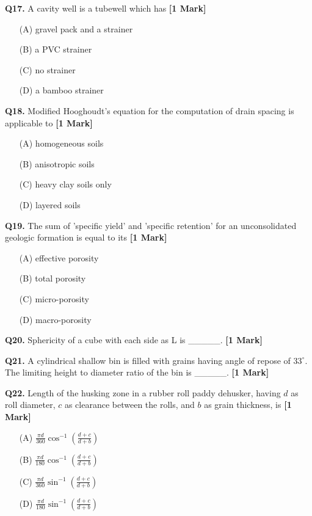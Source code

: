 \documentclass[11pt]{article}
\newcommand{\questiona}[2]{
    \noindent\textbf{Q#2.} #1 \hfill \textbf{[1 Mark]}
}
\begin{document}
\vspace{0.5cm}

\questiona{A cavity well is a tubewell which has}{17}
\begin{enumerate}
    \item[(A)] gravel pack and a strainer
    \item[(B)] a PVC strainer
    \item[(C)] no strainer
    \item[(D)] a bamboo strainer
\end{enumerate}

\vspace{0.5cm}

\questiona{Modified Hooghoudt's equation for the computation of drain spacing is applicable to}{18}
\begin{enumerate}
    \item[(A)] homogeneous soils
    \item[(B)] anisotropic soils
    \item[(C)] heavy clay soils only
    \item[(D)] layered soils
\end{enumerate}

\vspace{0.5cm}

\questiona{The sum of 'specific yield' and 'specific retention' for an unconsolidated geologic formation is equal to its}{19}
\begin{enumerate}
    \item[(A)] effective porosity
    \item[(B)] total porosity
    \item[(C)] micro-porosity
    \item[(D)] macro-porosity
\end{enumerate}

\vspace{0.5cm}

\questiona{Sphericity of a cube with each side as L is \_\_\_\_\_.}{20}

\vspace{0.5cm}

\questiona{A cylindrical shallow bin is filled with grains having angle of repose of $33^\circ$. The limiting height to diameter ratio of the bin is \_\_\_\_\_.}{21}

\vspace{0.5cm}

\questiona{Length of the husking zone in a rubber roll paddy dehusker, having $d$ as roll diameter, $c$ as clearance between the rolls, and $b$ as grain thickness, is}{22}
\begin{enumerate}
    \item[(A)] $\frac{\pi d}{360} \cos^{-1}\left(\frac{d+c}{d+b}\right)$
    \item[(B)] $\frac{\pi d}{180} \cos^{-1}\left(\frac{d+c}{d+b}\right)$
    \item[(C)] $\frac{\pi d}{360} \sin^{-1}\left(\frac{d+c}{d+b}\right)$
    \item[(D)] $\frac{\pi d}{180} \sin^{-1}\left(\frac{d+c}{d+b}\right)$
\end{enumerate}
\end{document}
